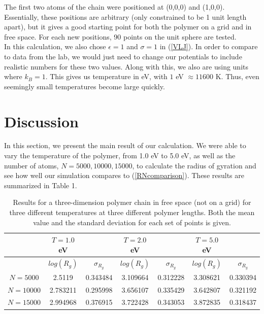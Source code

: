 \documentclass{article}
\begin{document}
\begin{multicols}{2}
The first two atoms of the chain were positioned at (0,0,0) and (1,0,0).  Essentially, these positions are arbitrary (only constrained to be 1 unit length apart), but it gives a good starting point for both the polymer on a grid and in free space.   For each new positions, 90 points on the unit sphere are tested.  \\

In this calculation, we also chose $\epsilon =1$ and $\sigma=1$ in (\ref{VLJ}).  In order to compare to data from the lab, we would just need to change our potentials to include realistic numbers for these two values.  Along with this, we also are using units where $k_B=1$.  This gives us temperature in eV, with $1$ eV $\approx 11600$ K.  Thus, even seemingly small temperatures become large quickly.\\

\section{Discussion}
\label{discuss}

In this section, we present the main result of our calculation.  We were able to vary the temperature of the polymer, from 1.0 eV to 5.0 eV, as well as the number of atoms, $N=5000, 10000, 15000$, to calculate the radius of gyration and see how well our simulation compares to (\ref{RNcomparison}).  These results are summarized in Table 1.  \\

\begin{table}
\begin{center}
\begin{tabular}{| c | c | c | c | c | c | c |}
\hline & $T=1.0$ eV &  & $T=2.0$ eV &  & $T=5.0$ eV & \\ \hline
 & \textbf{$log(R_g)$} & \textbf{$\sigma _{R_g}$} & \textbf{$log(R_g)$} & \textbf{$\sigma _{R_g}$} & \textbf{$log(R_g)$} & \textbf{$\sigma _{R_g}$} \\ \hline
$N=5000$ & 2.5119 & 0.343484 & 3.109664 & 0.312228 & 3.308621 & 0.330394 \\ \hline
$N=10000$ & 2.783211 & 0.295998 & 3.656107 & 0.335429 & 3.642807 & 0.321192 \\ \hline
$N=15000$ & 2.994968 & 0.376915 & 3.722428 & 0.343053 & 3.872835 & 0.318437 \\ \hline
\end{tabular}
\label{results}
\caption{Results for a three-dimension polymer chain in free space (not on a grid) for three different temperatures at three different polymer lengths.  Both the mean value and the standard deviation for each set of points is given.}
\end{center}
\end{table}


\end{multicols}
\end{document}
